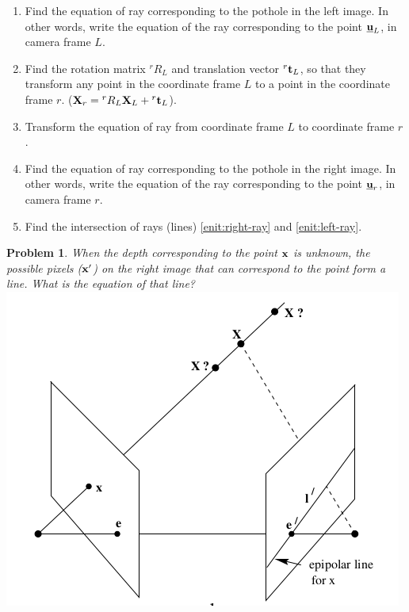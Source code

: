 \documentclass[times,singlecolumn]{article}
\newcommand{\ubfu}{\underline{\bfu}}
\newtheorem{prob}{Problem}
\begin{document}
\newpage
\begin{enumerate}
\item Find the equation of ray corresponding to the pothole in the left image.
  In other words, write the equation of the ray corresponding to the point
  $\ubfu_L$, in camera frame $L$.
  \vspace{10em}

\item Find the rotation matrix ${}^rR_L$ and translation vector ${}^r\mathbf{t}_L$, so
  that they transform any point in the coordinate frame $L$ to a point in the
  coordinate frame $r$. ($\mathbf{X}_r = {}^rR_L \mathbf{X}_L + {}^r\mathbf{t}_L$).
  \vspace{10em}

\item Transform the equation of ray from coordinate frame $L$ to coordinate
  frame $r$.
  \label{enit:left-ray}
  \vspace{10em}

\item Find the equation of ray corresponding to the pothole in the right image.
  In other words, write the equation of the ray corresponding to the point
  $\ubfu_r$, in camera frame $r$.
  \label{enit:right-ray}
  \vspace{10em}

\item Find the intersection of rays (lines) \ref{enit:right-ray} and \ref{enit:left-ray}.
  \vspace{10em}
\end{enumerate}

\newpage
\begin{prob}
  When the depth corresponding to the point $\mathbf{x}$ is unknown, the possible
  pixels ($\mathbf{x}'$) on the right image that can correspond to  the point form a
  line. What is the equation of that line?
  \\
  \includegraphics[width=0.5\linewidth]{media/epipolar-line.png}
\end{prob}
\end{document}
